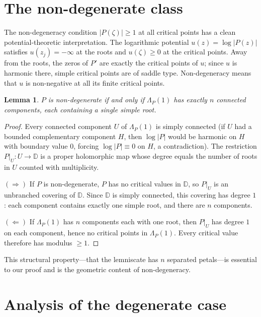 \documentclass[11pt,a4paper]{amsart}
\newtheorem{lemma}[theorem]{Lemma}
\theoremstyle{definition}
\newcommand{\D}{\mathbb{D}}
\newcommand{\abs}[1]{\lvert #1 \rvert}
\begin{document}
\section{The non-degenerate class}

The non-degeneracy condition $\abs{P(\zeta)} \geq 1$ at all critical points
has a clean potential-theoretic interpretation.  The logarithmic potential
$u(z) = \log\abs{P(z)}$ satisfies $u(z_j) = -\infty$ at the roots
and $u(\zeta) \geq 0$ at the critical points.
Away from the roots, the zeros of $P'$ are exactly the critical points
of $u$; since $u$ is harmonic there, simple critical points are of
saddle type.
Non-degeneracy means that $u$ is non-negative at all its finite
critical points.

\begin{lemma}\label{lem:petals}
$P$ is non-degenerate if and only if $\Lambda_P(1)$ has
exactly $n$ connected components, each containing a single simple root.
\end{lemma}

\begin{proof}
Every connected component $U$ of $\Lambda_P(1)$ is simply connected
(if $U$ had a bounded complementary component $H$, then
$\log\abs{P}$ would be harmonic on $H$ with boundary value $0$,
forcing $\log\abs{P} \equiv 0$ on $H$, a contradiction).
The restriction $P|_U \colon U \to \D$ is a proper holomorphic map
whose degree equals the number of roots in $U$ counted with multiplicity.

$(\Rightarrow)$  If $P$ is non-degenerate, $P$ has no critical values in
$\D$, so $P|_U$ is an unbranched covering of $\D$.  Since $\D$ is simply
connected, this covering has degree $1$: each component contains exactly
one simple root, and there are $n$ components.

$(\Leftarrow)$  If $\Lambda_P(1)$ has $n$ components each with one root,
then $P|_U$ has degree $1$ on each component, hence no critical points
in $\Lambda_P(1)$.  Every critical value therefore has modulus $\geq 1$.
\end{proof}

This structural property---that the lemniscate has $n$ separated petals---is
essential to our proof and is the geometric content of non-degeneracy.

\section{Analysis of the degenerate case}
\label{sec:degenerate}
\end{document}
